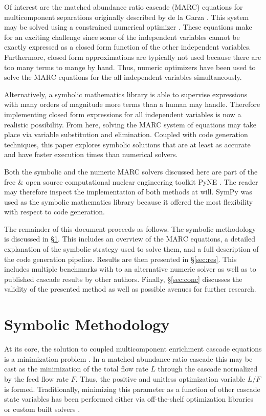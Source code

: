 \documentclass[preprint,12pt]{elsarticle}
\begin{document}
Of interest are the matched abundance ratio cascade (MARC) equations for 
multicomponent separations originally described by de la Garza \cite{DelaGarza1969}.
This system may be solved using a constrained numerical optimizer 
\cite{doi:10.1080/01496391003793884,pyne:enrichment}.  These equations make for an
exciting challenge since some of the independent variables cannot be exactly
expressed as a closed form function of the other independent variables. 
Furthermore, closed form approximations are typically not used because 
there are too many terms to mange by hand.  Thus, numeric optimizers have been used 
to solve the MARC equations for the all independent variables simultaneously.

Alternatively, a symbolic mathematics library is able to supervise expressions 
with many orders of magnitude more terms than a human may handle.  Therefore
implementing closed form expressions for all independent variables is now a realistic 
possibility.  From here, solving the MARC system of equations may take place via
variable substitution and elimination.
Coupled with code generation techniques, this paper explores symbolic solutions 
that are at least as accurate and have faster execution times than numerical solvers.

Both the symbolic and the numeric MARC solvers discussed here are part of the free 
\& open source computational nuclear engineering toolkit PyNE \cite{PyNE2012}.  
The reader may therefore inspect the implementation of both methods at will.
SymPy was used as the symbolic mathematics library because 
it offered the most flexibility with respect to code generation.

The remainder of this document proceeds as follows.  The symbolic methodology 
is discussed in \S\ref{sec:meth}.  This includes an overview of the
MARC equations, a detailed explanation of the symbolic strategy used to solve 
them, and a full description of the code generation pipeline.
Results are then presented in \S\ref{sec:res}.  This includes multiple benchmarks
with to an alternative numeric solver as well as to published cascade results by other 
authors.  Finally, \S\ref{sec:conc} discusses the validity of the presented method
as well as possible avenues for further research.

\section{Symbolic Methodology}
\label{sec:meth}
At its core, the solution to coupled multicomponent enrichment cascade equations is
a minimization problem \cite{Wood1999}.  In a matched abundance ratio 
\cite{DelaGarza1969} cascade this may be cast as the minimization of 
the total flow rate $L$ through the cascade normalized by the feed flow rate $F$.  
Thus, the positive and unitless optimization variable $L/F$ is formed.  Traditionally, 
minimizing this parameter as a function of other cascade state variables has been 
performed either via off-the-shelf optimization libraries 
\cite{doi:10.1080/01496391003793884} or custom built solvers \cite{PyNE2012}.
\end{document}
